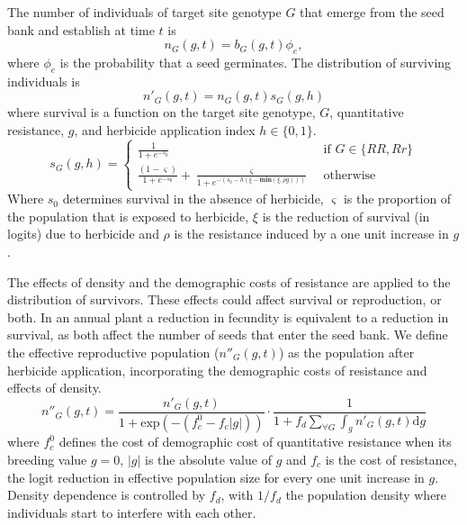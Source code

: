 \documentclass[10pt,letterpaper]{article}
\begin{document}
The number of individuals of target site genotype $G$ that emerge from the seed bank and establish at time $t$ is 
\begin{equation}\label{eq:above_ground}
	n_G(g, t) = b_G(g, t)\phi_e,
\end{equation}
where $\phi_e$ is the probability that a seed germinates. The distribution of surviving individuals is 
\begin{equation}\label{eq:abg_sur}
	n'_G(g, t) = n_G(g, t)s_G(g, h) 
\end{equation}
where survival is a function on the target site genotype, $G$, quantitative resistance, $g$, and herbicide application index $h \in \{0, 1\}$.   
\begin{equation}\label{eq:sur_G}
	s_G(g, h) = \begin{cases} 
		\frac{1}{1 + e^{-s_0}} &\text{~if~} G \in \{RR, Rr\} \\
		\frac{(1 - \varsigma)}{1 + e^{-s_0}} + \frac{\varsigma}{1 + e^{-\left(s_0 - h\left(\xi - \textbf{min}(\xi, \rho g) \right)\right)}} &\text{~otherwise~} 		
	\end{cases} 
\end{equation}  
Where $s_0$ determines survival in the absence of herbicide, $\varsigma$ is the proportion of the population that is exposed to herbicide, $\xi$ is the reduction of survival (in logits) due to herbicide and $\rho$ is the resistance induced by a one unit increase in $g$.   

The effects of density and the demographic costs of resistance are applied to the distribution of survivors. These effects could affect survival or reproduction, or both. In an annual plant a reduction in fecundity is equivalent to a reduction in survival, as both affect the number of seeds that enter the seed bank. We define the effective reproductive population ($n''_G(g, t)$) as the population after herbicide application, incorporating the demographic costs of resistance and effects of density. 
\begin{equation}\label{eq:effect_pop}
	n''_G(g, t) = \frac{n'_G(g, t)}{1 + \text{exp}(-(f_c^0 - f_c|g|))}\cdot\frac{1}{1 + f_d\sum_{\forall G} \int_g n'_G(g, t)\text{d}g}
\end{equation} 
where $f_c^0$ defines the cost of demographic cost of quantitative resistance when its breeding value $g = 0$, $|g|$ is the absolute value of $g$ and $f_c$ is the cost of resistance, the logit reduction in effective population size for every one unit increase in $g$. Density dependence is controlled by $f_d$, with $1/f_d$ the population density where individuals start to interfere with each other. 
\end{document}
